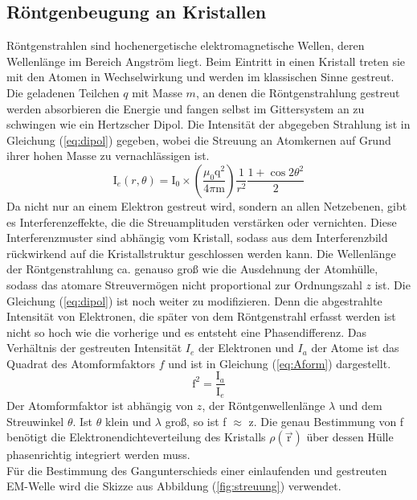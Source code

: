 \subsection{Röntgenbeugung an Kristallen}
Röntgenstrahlen sind hochenergetische elektromagnetische Wellen, deren Wellenlänge im Bereich Angström liegt. 
Beim Eintritt in einen Kristall treten sie mit den Atomen in Wechselwirkung und werden im klassischen Sinne gestreut.
Die geladenen Teilchen $q$ mit Masse $m$, an denen die Röntgenstrahlung gestreut werden absorbieren die Energie und fangen selbst im Gittersystem an zu schwingen wie ein Hertzscher Dipol.
Die Intensität der abgegeben Strahlung ist in Gleichung (\ref{eq:dipol}) gegeben, wobei die Streuung an Atomkernen auf Grund ihrer hohen Masse zu vernachlässigen ist.
\begin{equation}
\text{I}_e(r,\theta) = \text{I}_0\times \left(\frac{\mu_0 \text{q}^2}{4 \pi \text{m}}\right) \frac{1}{r^2} \frac{1+\cos{2\theta}^2}{2}
\label{eq:dipol}
\end{equation}
Da nicht nur an einem Elektron gestreut wird, sondern an allen Netzebenen, gibt es Interferenzeffekte, die die Streuamplituden verstärken oder vernichten.
Diese Interferenzmuster sind abhängig vom Kristall, sodass aus dem Interferenzbild rückwirkend auf die Kristallstruktur geschlossen werden kann.
Die Wellenlänge der Röntgenstrahlung ca. genauso groß wie die Ausdehnung der Atomhülle, sodass das atomare Streuvermögen nicht proportional zur Ordnungszahl $z$ ist.
Die Gleichung (\ref{eq:dipol}) ist noch weiter zu modifizieren.
Denn die abgestrahlte Intensität von Elektronen, die später von dem Röntgenstrahl erfasst werden ist nicht so hoch wie die vorherige und es entsteht eine Phasendifferenz.
Das Verhältnis der gestreuten Intensität $I_e$ der Elektronen und $I_a$ der Atome ist das Quadrat des Atomformfaktors $f$ und ist in Gleichung (\ref{eq:Aform}) dargestellt.
\begin{equation}
\text{f}^2 = \frac{\text{I}_a}{\text{I}_e}
\label{eq:Aform}
\end{equation}
Der Atomformfaktor ist abhängig von $z$, der Röntgenwellenlänge $\lambda$ und dem Streuwinkel $\theta$. 
Ist $\theta$ klein und $\lambda$ groß, so ist f $\approx$ z.
Die genau Bestimmung von f benötigt die Elektronendichteverteilung des Kristalls $\rho(\vec{\text{r}})$ über dessen Hülle phasenrichtig integriert werden muss.\\
Für die Bestimmung des Gangunterschieds einer einlaufenden und gestreuten EM-Welle wird die Skizze aus Abbildung (\ref{fig:streuung}) verwendet.
